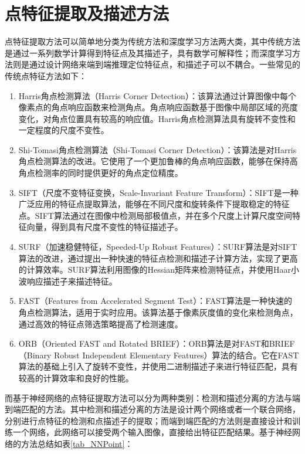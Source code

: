 \section{点特征提取及描述方法}
点特征提取方法可以简单地分类为传统方法和深度学习方法两大类，其中传统方法是通过一系列数学计算得到特征点及其描述子，具有数学可解释性；而深度学习方法则是通过设计网络来端到端推理定位特征点，和描述子可以不耦合。一些常见的传统点特征方法如下：
\begin{enumerate}
  \item Harris角点检测算法（Harris Corner Detection）：该算法通过计算图像中每个像素点的角点响应函数来检测角点。角点响应函数基于图像中局部区域的亮度变化，对角点位置具有较高的响应值。Harris角点检测算法具有旋转不变性和一定程度的尺度不变性。
  \item Shi-Tomasi角点检测算法（Shi-Tomasi Corner Detection）：该算法是对Harris角点检测算法的改进。它使用了一个更加鲁棒的角点响应函数，能够在保持高角点检测率的同时提供更好的角点定位精度。
  \item SIFT（尺度不变特征变换，Scale-Invariant Feature Transform）：SIFT是一种广泛应用的特征点提取算法，能够在不同尺度和旋转条件下提取稳定的特征点。SIFT算法通过在图像中检测局部极值点，并在多个尺度上计算尺度空间特征向量，得到具有尺度不变性的特征描述子。
  \item SURF（加速稳健特征，Speeded-Up Robust Features）：SURF算法是对SIFT算法的改进，通过提出一种快速的特征点检测和描述子计算方法，实现了更高的计算效率。SURF算法利用图像的Hessian矩阵来检测特征点，并使用Haar小波响应描述子来描述特征。
  \item FAST（Features from Accelerated Segment Test）：FAST算法是一种快速的角点检测算法，适用于实时应用。该算法基于像素灰度值的变化来检测角点，通过高效的特征点筛选策略提高了检测速度。
  \item ORB（Oriented FAST and Rotated BRIEF）：ORB算法是对FAST和BRIEF（Binary Robust Independent Elementary Features）算法的结合。它在FAST算法的基础上引入了旋转不变性，并使用二进制描述子来进行特征匹配，具有较高的计算效率和良好的性能。
\end{enumerate}
而基于神经网络的点特征提取方法可以分为两种类别：检测和描述分离的方法与端到端匹配的方法。其中检测和描述分离的方法是设计两个网络或者一个联合网络，分别进行点特征的检测和点描述子的提取；而端到端匹配的方法则是直接设计和训练一个网络，此网络可以接受两个输入图像，直接给出特征匹配结果。基于神经网络的方法总结如表\ref{tab_NNPoint}：

